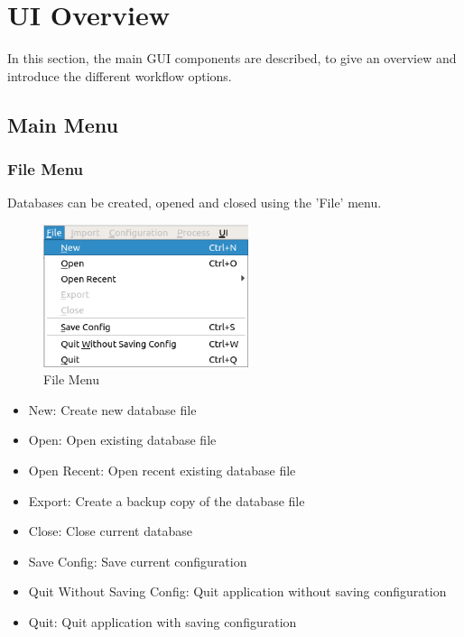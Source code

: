 \chapter{UI Overview}
\label{sec:ui_overview}

In this section, the main GUI components are described, to give an overview and introduce the different workflow options.



\section{Main Menu}
\label{sec:main_menu}

\subsection{File Menu}
\label{sec:ui_overview_file_menu}

Databases can be created, opened and closed using the 'File' menu.

\begin{figure}[H]
  \center
    \includegraphics[width=6cm,frame]{figures/ui_file_menu.png}
  \caption{File Menu}
\end{figure}

\begin{itemize}
 \item New: Create new database file
 \item Open: Open existing database file
 \item Open Recent: Open recent existing database file
 \item Export: Create a backup copy of the database file
 \item Close: Close current database
 \item Save Config: Save current configuration
 \item Quit Without Saving Config: Quit application without saving configuration
 \item Quit: Quit application with saving configuration
\end{itemize}
\  \\

